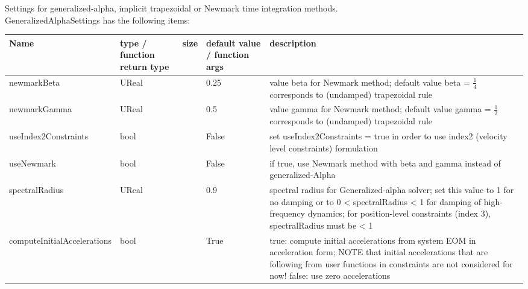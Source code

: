  \label{sec:GeneralizedAlphaSettings}
Settings for generalized-alpha, implicit trapezoidal or Newmark time integration methods.\\ 
%
GeneralizedAlphaSettings has the following items:
\begin{center}
  \footnotesize
  \begin{longtable}{| p{4.2cm} | p{2.5cm} | p{0.3cm} | p{3.0cm} | p{6cm} |}
    \hline
    \bf Name & \bf type / function return type & \bf size & \bf default value / function args & \bf description \\ \hline
    newmarkBeta &     UReal &      &     0.25 &     value beta for Newmark method; default value beta = $\frac 1 4$ corresponds to (undamped) trapezoidal rule\\ \hline
    newmarkGamma &     UReal &      &     0.5 &     value gamma for Newmark method; default value gamma = $\frac 1 2$ corresponds to (undamped) trapezoidal rule\\ \hline
    useIndex2Constraints &     bool &      &     False &     set useIndex2Constraints = true in order to use index2 (velocity level constraints) formulation\\ \hline
    useNewmark &     bool &      &     False &     if true, use Newmark method with beta and gamma instead of generalized-Alpha\\ \hline
    spectralRadius &     UReal &      &     0.9 &     spectral radius for Generalized-alpha solver; set this value to 1 for no damping or to 0 < spectralRadius < 1 for damping of high-frequency dynamics; for position-level constraints (index 3), spectralRadius must be < 1\\ \hline
    computeInitialAccelerations &     bool &      &     True &     true: compute initial accelerations from system EOM in acceleration form; NOTE that initial accelerations that are following from user functions in constraints are not considered for now! false: use zero accelerations\\ \hline
	  \end{longtable}
	\end{center}

